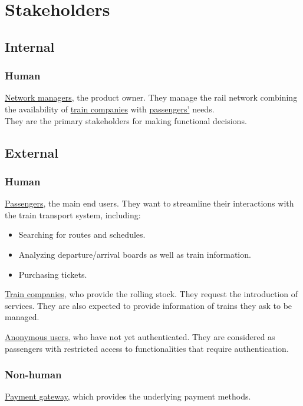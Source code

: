 \documentclass[12pt]{article}
\newcommand\un[1]{\underline{#1}}
\begin{document}
\section*{Stakeholders}

\subsection*{Internal}

\subsubsection*{Human}
\un{Network managers}, the product owner. They manage the rail network combining the availability of \un{train companies} with \un{passengers'} needs.\\
They are the primary stakeholders for making functional decisions.

\subsection*{External}

\subsubsection*{Human}
\un{Passengers}, the main end users. They want to streamline their interactions with the train transport system, including:
\begin{itemize}
	\item Searching for routes and schedules.
	\item Analyzing departure/arrival boards as well as train information.
	\item Purchasing tickets.
\end{itemize}

\noindent\un{Train companies}, who provide the rolling stock. They request the introduction of services. They are also expected to provide information of trains they ask to be managed.

\noindent\un{Anonymous users}, who have not yet authenticated. They are considered as passengers with restricted access to functionalities that require authentication.

\subsubsection*{Non-human}
\un{Payment gateway}, which provides the underlying payment methods.\\
\end{document}
